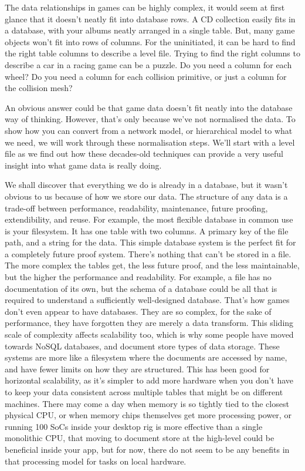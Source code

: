 \documentclass[a4paper,12pt]{book}
\begin{document}
The data relationships in games can be highly complex, it would seem at first glance that it doesn't neatly fit into database rows.
A CD collection easily fits in a database, with your albums neatly arranged in a single table.
But, many game objects won't fit into rows of columns.
For the uninitiated, it can be hard to find the right table columns to describe a level file.
Trying to find the right columns to describe a car in a racing game can be a puzzle.
Do you need a column for each wheel? Do you need a column for each collision primitive, or just a column for the collision mesh?

An obvious answer could be that game data doesn't fit neatly into the database way of thinking.
However, that's only because we've not normalised the data.
To show how you can convert from a network model, or hierarchical model to what we need, we will work through these normalisation steps.
We'll start with a level file as we find out how these decades-old techniques can provide a very useful insight into what game data is really doing.

We shall discover that everything we do is already in a database, but it wasn't obvious to us because of how we store our data.
The structure of any data is a trade-off between performance, readability, maintenance, future proofing, extendibility, and reuse.
For example, the most flexible database in common use is your filesystem.
It has one table with two columns. A primary key of the file path, and a string for the data.
This simple database system is the perfect fit for a completely future proof system.
There's nothing that can't be stored in a file.
The more complex the tables get, the less future proof, and the less maintainable, but the higher the performance and readability.
For example, a file has no documentation of its own, but the schema of a database could be all that is required to understand a sufficiently well-designed database.
That's how games don't even appear to have databases.
They are so complex, for the sake of performance, they have forgotten they are merely a data transform.
This sliding scale of complexity affects scalability too, which is why some people have moved towards NoSQL databases, and document store types of data storage.
These systems are more like a filesystem where the documents are accessed by name, and have fewer limits on how they are structured.
This has been good for horizontal scalability, as it's simpler to add more hardware when you don't have to keep your data consistent across multiple tables that might be on different machines.
There may come a day when memory is so tightly tied to the closest physical CPU, or when memory chips themselves get more processing power, or running 100 SoCs inside your desktop rig is more effective than a single monolithic CPU, that moving to document store at the high-level could be beneficial inside your app, but for now, there do not seem to be any benefits in that processing model for tasks on local hardware.
\end{document}
